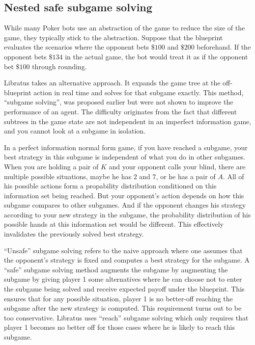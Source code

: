 \documentclass[10pt,a4paper]{article}
\begin{document}
\subsection{Nested safe subgame solving}
While many Poker bots use an abstraction of the game to reduce the size of the game, they typically stick to the abstraction. Suppose that the blueprint evaluates the scenarios where the opponent bets $\$100$ and $\$200$ beforehand. If the opponent bets $\$134$ in the actual game, the bot would treat it as if the opponent bet $\$100$ through rounding.

Libratus takes an alternative approach. It expands the game tree at the off-blueprint action in real time and solves for that subgame exactly. This method, ``subgame solving'', was proposed earlier but were not shown to improve the performance of an agent. The difficulty originates from the fact that different subtrees in the game state are not independent in an imperfect information game, and you cannot look at a subgame in isolation.

In a perfect information normal form game, if you have reached a subgame, your best strategy in this subgame is independent of what you do in other subgames. When you are holding a pair of $K$ and your opponent calls your blind, there are multiple possible situations, maybe he has $2$ and $7$, or he has a pair of $A$. All of his possible actions form a propability distribution conditioned on this information set being reached. But your opponent's action depends on how this subgame compares to other subgames. And if the opponent changes his strategy according to your new strategy in the subgame, the probability distribution of his possible hands at this information set would be different. This effectively invalidates the previously solved best strategy.

``Unsafe'' subgame solving refers to the naive approach where one assumes that the opponent's strategy is fixed and computes a best strategy for the subgame. A ``safe'' subgame solving method augments the subgame by augmenting the subgame by giving player 1 some alternatives where he can choose not to enter the subgame being solved and receive expected payoff under the blueprint. This ensures that for any possible situation, player 1 is no better-off reaching the subgame after the new strategy is computed. This requirement turns out to be too conservative. Libratus uses ``reach'' subgame solving which only requires that player 1 becomes no better off for those cases where he is likely to reach this subgame.
\end{document}
